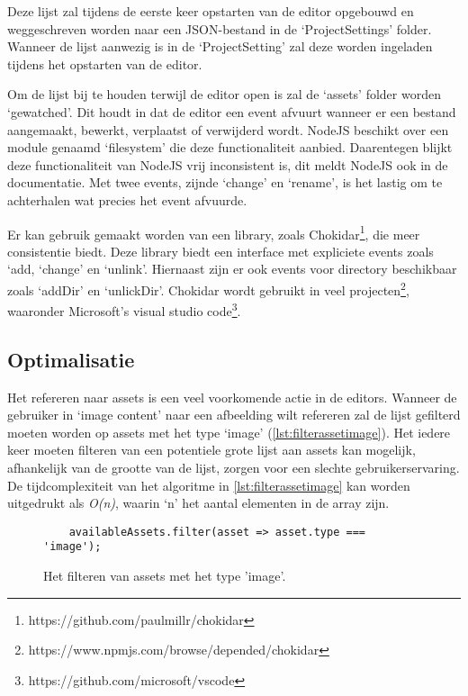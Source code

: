 Deze lijst zal tijdens de eerste keer opstarten van de editor opgebouwd en weggeschreven worden naar een JSON-bestand in de ‘ProjectSettings’ folder. Wanneer de lijst aanwezig is in de ‘ProjectSetting’ zal deze worden ingeladen tijdens het opstarten van de editor.

Om de lijst bij te houden terwijl de editor open is zal de ‘assets’ folder worden ‘gewatched’. Dit houdt in dat de editor een event afvuurt wanneer er een bestand aangemaakt, bewerkt, verplaatst of verwijderd wordt. NodeJS beschikt over een module genaamd ‘filesystem’ die deze functionaliteit aanbied. Daarentegen blijkt deze functionaliteit van NodeJS vrij inconsistent is, dit meldt NodeJS ook in de documentatie\cite{NodeDocFS}. Met twee events, zijnde ‘change’ en ‘rename’, is het lastig om te achterhalen wat precies het event afvuurde. 

Er kan gebruik gemaakt worden van een library, zoals Chokidar\footnote{https://github.com/paulmillr/chokidar}, die meer consistentie biedt. Deze library biedt een interface met expliciete events zoals ‘add, ‘change’ en ‘unlink’. Hiernaast zijn er ook events voor directory beschikbaar zoals ‘addDir’ en ‘unlickDir’. Chokidar wordt gebruikt in veel projecten\footnote{https://www.npmjs.com/browse/depended/chokidar}, waaronder Microsoft’s visual studio code\footnote{https://github.com/microsoft/vscode}. 

\subsection{Optimalisatie}
\label{subsec:optimalisationformat}
Het refereren naar assets is een veel voorkomende actie in de editors. Wanneer de gebruiker in ‘image content’ naar een afbeelding wilt refereren zal de lijst gefilterd moeten worden op assets met het type ‘image’ (\autoref{lst:filterassetimage}). Het iedere keer moeten filteren van een potentiele grote lijst aan assets kan mogelijk, afhankelijk van de grootte van de lijst, zorgen voor een slechte gebruikerservaring. De tijdcomplexiteit van het algoritme in \autoref{lst:filterassetimage} kan worden uitgedrukt als \textit{O(n)}, waarin ‘n’ het aantal elementen in de array zijn. 

\begin{figure}[htb]
    \centering
    \lstset{language=JavaScript}
    \begin{lstlisting}
    availableAssets.filter(asset => asset.type === 'image');
    \end{lstlisting}
    \caption{Het filteren van assets met het type 'image'.}
    \label{lst:filterassetimage}
\end{figure}

